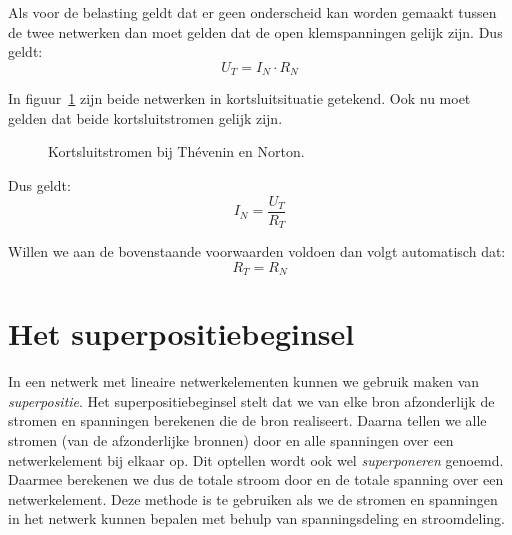  Als voor de belasting geldt dat er geen
onderscheid kan worden gemaakt tussen de twee netwerken dan moet gelden dat de open klemspanningen
gelijk zijn. Dus geldt:
%
\begin{equation}
U_T = I_N\cdot R_N
\end{equation}

In figuur~\ref{fig:gelkortsluitstromenbijtheveninennorton} zijn beide netwerken in kortsluitsituatie
getekend. Ook nu moet gelden dat beide kortsluitstromen gelijk zijn.
\begin{figure}[!ht]
\centering
\begin{subfigure}[b]{0.48\textwidth}
\centering
{}
\end{subfigure}%
\begin{subfigure}[b]{0.48\textwidth}
\centering
{}
\end{subfigure}
\caption{Kortsluitstromen bij Th\'evenin en Norton.}
\label{fig:gelkortsluitstromenbijtheveninennorton}
\end{figure}

Dus geldt:
%
\begin{equation}
I_N = \dfrac{U_T}{R_T}
\end{equation}

Willen we aan de bovenstaande voorwaarden voldoen dan volgt automatisch dat:
%
\begin{equation}
R_T = R_N
\end{equation}


\section{Het superpositiebeginsel}
\label{sec:gelsuperpositie}
In een netwerk met lineaire netwerkelementen kunnen we gebruik maken van 
\textsl{superpositie}. Het superpositiebeginsel stelt dat we van elke bron
afzonderlijk de stromen en spanningen berekenen die de bron realiseert.
Daarna tellen we alle stromen (van de afzonderlijke bronnen) door en
alle spanningen over een netwerkelement bij elkaar op. Dit optellen wordt
ook wel \textsl{superponeren} genoemd. Daarmee berekenen we dus de
totale stroom door en de totale spanning over een netwerkelement. Deze
methode is te gebruiken als we de stromen en spanningen in het netwerk
kunnen bepalen met behulp van spanningsdeling en stroomdeling.

